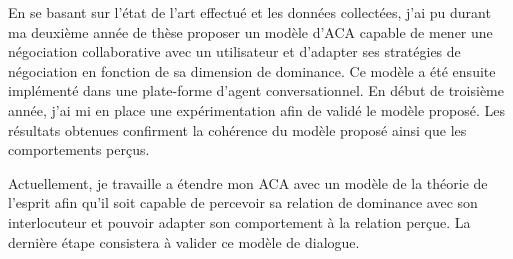 \documentclass  [french] {article}
\begin{document}
	En se basant sur l'état de l'art effectué et les données collectées, j'ai pu durant ma deuxième année de thèse proposer un modèle d'ACA capable de mener une négociation collaborative avec un utilisateur et d'adapter ses stratégies de négociation en fonction de sa dimension de dominance.  Ce modèle a été ensuite implémenté dans une plate-forme d'agent conversationnel. En début de troisième année, j'ai mi en place une expérimentation afin de validé le modèle proposé. Les résultats obtenues confirment la cohérence du modèle proposé ainsi que les comportements perçus.
	
	Actuellement, je travaille a étendre mon ACA avec un modèle de la théorie de l'esprit afin qu'il soit capable de percevoir sa relation de dominance avec son interlocuteur et pouvoir adapter son comportement à la relation perçue. La dernière étape consistera à valider ce modèle de dialogue.
	 
	  
	
	

	
\end{document}
